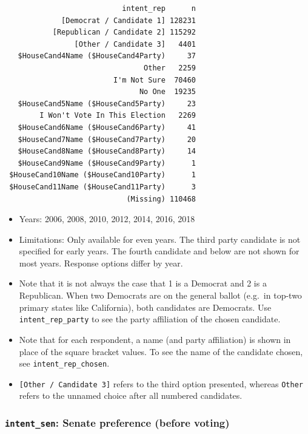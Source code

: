\documentclass[10pt,article,oneside]{memoir}
\theoremstyle{definition}
\begin{document}
\begin{verbatim}
                           intent_rep      n
             [Democrat / Candidate 1] 128231
           [Republican / Candidate 2] 115292
                [Other / Candidate 3]   4401
   $HouseCand4Name ($HouseCand4Party)     37
                                Other   2259
                         I'm Not Sure  70460
                               No One  19235
   $HouseCand5Name ($HouseCand5Party)     23
        I Won't Vote In This Election   2269
   $HouseCand6Name ($HouseCand6Party)     41
   $HouseCand7Name ($HouseCand7Party)     20
   $HouseCand8Name ($HouseCand8Party)     14
   $HouseCand9Name ($HouseCand9Party)      1
 $HouseCand10Name ($HouseCand10Party)      1
 $HouseCand11Name ($HouseCand11Party)      3
                            (Missing) 110468
\end{verbatim}

\begin{itemize}
\tightlist
\item
  Years: 2006, 2008, 2010, 2012, 2014, 2016, 2018
\item
  Limitations: Only available for even years. The third party candidate
  is not specified for early years. The fourth candidate and below are
  not shown for most years. Response options differ by year.
\item
  Note that it is not always the case that 1 is a Democrat and 2 is a
  Republican. When two Democrats are on the general ballot (e.g.~in
  top-two primary states like California), both candidates are
  Democrats. Use \texttt{intent\_rep\_party} to see the party
  affiliation of the chosen candidate.
\item
  Note that for each respondent, a name (and party affiliation) is shown
  in place of the square bracket values. To see the name of the
  candidate chosen, see \texttt{intent\_rep\_chosen}.
\item
  \texttt{{[}Other\ /\ Candidate\ 3{]}} refers to the third option
  presented, whereas \texttt{Other} refers to the unnamed choice after
  all numbered candidates.
\end{itemize}

\subsubsection{\texorpdfstring{\texttt{intent\_sen}: Senate preference
(before
voting)}{intent\_sen: Senate preference (before voting)}}\label{intent_sen-senate-preference-before-voting}
\end{document}

